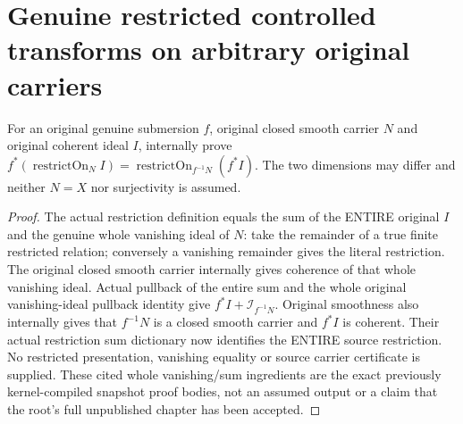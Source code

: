 \section{Genuine restricted controlled transforms on arbitrary original carriers}

\begin{theorem}
\label{hir:submersion-relative-control-whole-restriction}
\leanok
For an original genuine submersion $f$, original closed smooth carrier $N$
and original coherent ideal $I$, internally prove
$f^*(\operatorname{restrictOn}_N I)=\operatorname{restrictOn}_{f^{-1}N}(f^*I)$.
The two dimensions may differ and neither $N=X$ nor surjectivity is assumed.
\end{theorem}
\begin{proof}
The actual restriction definition equals the sum of the ENTIRE original
$I$ and the genuine whole vanishing ideal of $N$: take the remainder of a
true finite restricted relation; conversely a vanishing remainder gives the
literal restriction. The original closed smooth carrier internally gives
coherence of that whole vanishing ideal. Actual pullback of the entire sum
and the whole original vanishing-ideal pullback identity give
$f^*I+\mathcal I_{f^{-1}N}$. Original smoothness also internally gives that
$f^{-1}N$ is a closed smooth carrier and $f^*I$ is coherent. Their actual
restriction sum dictionary now identifies the ENTIRE source restriction.
No restricted presentation, vanishing equality or source carrier certificate
is supplied. These cited whole vanishing/sum ingredients are the exact
previously kernel-compiled snapshot proof bodies, not an assumed output or
a claim that the root's full unpublished chapter has been accepted.
\end{proof}

